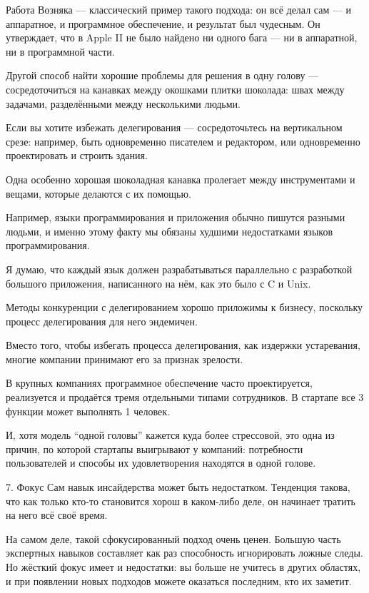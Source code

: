\documentclass[ebook,12pt,oneside,openany]{memoir}
\begin{document}
Работа Возняка — классический пример такого подхода: он всё делал сам
— и аппаратное, и программное обеспечение, и результат был чудесным.
Он утверждает, что в Apple II не было найдено ни одного бага — ни в
аппаратной, ни в программной части.

Другой способ найти хорошие проблемы для решения в одну голову —
сосредоточиться на канавках между окошками плитки шоколада: швах между
задачами, разделёнными между несколькими людьми.

Если вы хотите избежать делегирования — сосредоточьтесь на
вертикальном срезе: например, быть одновременно писателем и
редактором, или одновременно проектировать и строить здания.

Одна особенно хорошая шоколадная канавка пролегает между инструментами
и вещами, которые делаются с их помощью.

Например, языки программирования и приложения обычно пишутся разными
людьми, и именно этому факту мы обязаны худшими недостатками языков
программирования.

Я думаю, что каждый язык должен разрабатываться параллельно с
разработкой большого приложения, написанного на нём, как это было с C
и Unix.

Методы конкуренции с делегированием хорошо приложимы к бизнесу,
поскольку процесс делегирования для него эндемичен.

Вместо того, чтобы избегать процесса делегирования, как издержки
устаревания, многие компании принимают его за признак зрелости.

В крупных компаниях программное обеспечение часто проектируется,
реализуется и продаётся тремя отдельными типами сотрудников. В
стартапе все 3 функции может выполнять 1 человек.

И, хотя модель “одной головы” кажется куда более стрессовой, это одна
из причин, по которой стартапы выигрывают у компаний: потребности
пользователей и способы их удовлетворения находятся в одной голове.

7. Фокус Сам навык инсайдерства может быть недостатком. Тенденция
такова, что как только кто-то становится хорош в каком-либо деле, он
начинает тратить на него всё своё время.

На самом деле, такой сфокусированный подход очень ценен. Большую часть
экспертных навыков составляет как раз способность игнорировать ложные
следы. Но жёсткий фокус имеет и недостатки: вы больше не учитесь в
других областях, и при появлении новых подходов можете оказаться
последним, кто их заметит.
\end{document}
